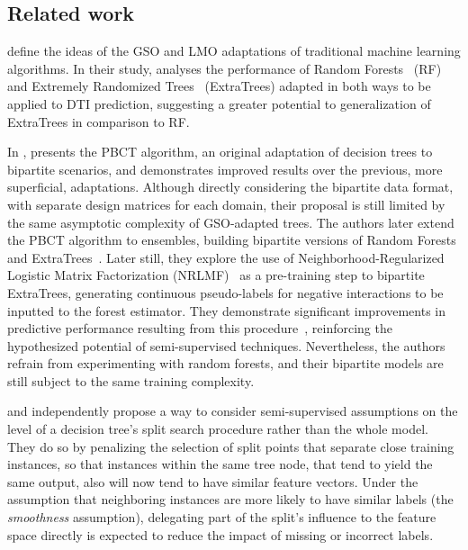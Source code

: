 \begin{itemize}


\section{Related work}
\label{sec:related_work}


\cite{schrynemackers2015classifying} define the ideas of the GSO and LMO adaptations of traditional machine learning algorithms. In their study, \cite{schrynemackers2015classifying} analyses the performance of Random Forests~\citep{breiman2001random} (RF) and Extremely Randomized Trees~\citep{geurts2006extremely} (ExtraTrees) adapted in both ways to be applied to DTI prediction, suggesting a greater potential to generalization of ExtraTrees in comparison to RF.

In \citeyear{pliakos2018global}, \cite{pliakos2018global} presents the PBCT algorithm, an original adaptation of decision trees to bipartite scenarios, and demonstrates improved results over the previous, more superficial, adaptations. Although directly considering the bipartite data format, with separate design matrices for each domain, their proposal is still limited by the same asymptotic complexity of GSO-adapted trees.
The authors later extend the PBCT algorithm to ensembles, building bipartite versions of Random Forests and ExtraTrees~\cite{pliakos2019network}. Later still, they explore the use of Neighborhood-Regularized Logistic Matrix Factorization (NRLMF)~\citep{liu2016neighborhood} as a pre-training step to bipartite ExtraTrees, generating continuous pseudo-labels for negative interactions to be inputted to the forest estimator. They demonstrate significant improvements in predictive performance resulting from this procedure~\cite{pliakos2019network}, reinforcing the hypothesized potential of semi-supervised techniques. Nevertheless, the authors refrain from experimenting with random forests, and their bipartite models are still subject to the same training complexity.

\cite{levatic2017semisupervised} and {} independently propose a way to consider semi-supervised assumptions on the level of a decision tree's split search procedure rather than the whole model. They do so by penalizing the selection of split points that separate close training instances, so that instances within the same tree node, that tend to yield the same output, also will now tend to have similar feature vectors. Under the assumption that neighboring instances are more likely to have similar labels (the \emph{smoothness} assumption), delegating part of the split's influence to the feature space directly is expected to reduce the impact of missing or incorrect labels. 


\end{itemize}
